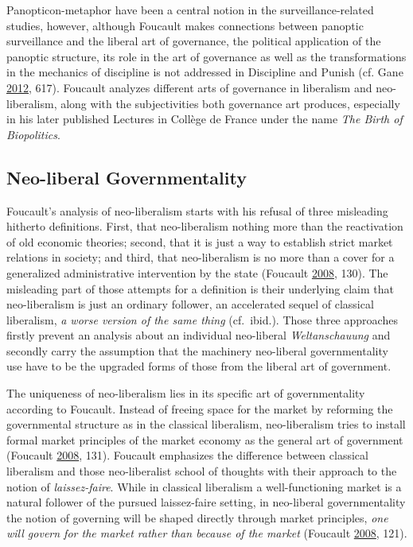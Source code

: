 \documentclass[12pt,twoside]{report}
\begin{document}
Panopticon-metaphor have been a central notion in the surveillance-related studies, however, although Foucault makes connections between panoptic surveillance and the liberal art of governance, the political application of the panoptic structure, its role in the art of governance as well as the transformations in the mechanics of discipline is not addressed in Discipline and Punish (cf. Gane \protect\hyperlink{ref-Gane2012}{2012}, 617). Foucault analyzes different arts of governance in liberalism and neo-liberalism, along with the subjectivities both governance art produces, especially in his later published Lectures in Collège de France under the name \emph{The Birth of Biopolitics}.

\hypertarget{neo-liberal-governmentality}{%
\subsection{Neo-liberal Governmentality}\label{neo-liberal-governmentality}}

Foucault's analysis of neo-liberalism starts with his refusal of three misleading hitherto definitions. First, that neo-liberalism nothing more than the reactivation of old economic theories; second, that it is just a way to establish strict market relations in society; and third, that neo-liberalism is no more than a cover for a generalized administrative intervention by the state (Foucault \protect\hyperlink{ref-Foucault2008}{2008}, 130). The misleading part of those attempts for a definition is their underlying claim that neo-liberalism is just an ordinary follower, an accelerated sequel of classical liberalism, \emph{a worse version of the same thing} (cf.~ibid.). Those three approaches firstly prevent an analysis about an individual neo-liberal \emph{Weltanschauung} and secondly carry the assumption that the machinery neo-liberal governmentality use have to be the upgraded forms of those from the liberal art of government.

The uniqueness of neo-liberalism lies in its specific art of governmentality according to Foucault. Instead of freeing space for the market by reforming the governmental structure as in the classical liberalism, neo-liberalism tries to install formal market principles of the market economy as the general art of government (Foucault \protect\hyperlink{ref-Foucault2008}{2008}, 131). Foucault emphasizes the difference between classical liberalism and those neo-liberalist school of thoughts with their approach to the notion of \emph{laissez-faire}. While in classical liberalism a well-functioning market is a natural follower of the pursued laissez-faire setting, in neo-liberal governmentality the notion of governing will be shaped directly through market principles, \emph{one will govern for the market rather than because of the market} (Foucault \protect\hyperlink{ref-Foucault2008}{2008}, 121).
\end{document}
